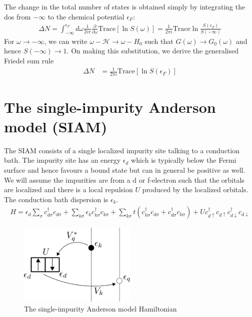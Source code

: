 The change in the total number of states is obtained simply by integrating the dos from \(-\infty\) to the chemical potential \(\epsilon_F\):
\begin{equation}\begin{aligned}
	\Delta N = \int_{-\infty}^{\epsilon_F}d\omega\frac{1}{2i\pi}\frac{\partial{}}{\partial{\omega}} \text{Trace}\left[\ln S(\omega)\right] = \frac{1}{2\pi i}\text{Trace} \ln \frac{S(\epsilon_F)}{S(-\infty)}
\end{aligned}\end{equation}
For \(\omega \to -\infty\), we can write \(\omega - \mathcal{H} \to \omega - H_0\) such that \(G(\omega) \to G_0(\omega)\) and hence \(S(-\infty) \to 1\). On making this substitution, we derive the generalised Friedel sum rule \cite{langer1961friedel}
\begin{equation}\begin{aligned}
	\Delta N &= \frac{1}{2\pi i}\text{Trace} \left[\ln S(\epsilon_F)\right]
\end{aligned}\end{equation}

\section{The single-impurity Anderson model (SIAM)}
The SIAM consists of a single localized impurity site talking to a conduction bath. The impurity site has an energy \(\epsilon_d\) which is typically below the Fermi surface and hence favours a bound state but can in general be positive as well. We will assume the impurities are from a d or f-electron such that the orbitals are localized and there is a local repulsion \(U\) produced by the localized orbitals. The conduction bath dispersion is \(\epsilon_k\).
\begin{equation}\begin{aligned}
	\label{model}
	H = \epsilon_d \sum_\sigma c^\dagger_{d\sigma}c_{d\sigma} + \sum_{k\sigma} \epsilon_k c^\dagger_{k\sigma}c_{k\sigma} + \sum_{k\sigma}t\left(c^\dagger_{k\sigma}c_{d\sigma}+c^\dagger_{d\sigma}c_{k\sigma}\right) + Uc^\dagger_{d\uparrow}c_{d\uparrow}c^\dagger_{d\downarrow}c_{d\downarrow}
\end{aligned}\end{equation}
\begin{figure}[!htpb]
	\centering
	\includegraphics[width=0.5\textwidth]{../figures/model_scheme.png}
	\caption{The single-impurity Anderson model Hamiltonian}
\end{figure}


